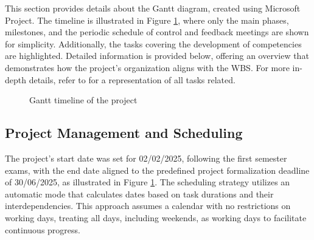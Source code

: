 This section provides details about the Gantt diagram, created using Microsoft Project. The timeline is illustrated in Figure \ref{fig:gantt_timeline}, where only the main phases, milestones, and the periodic schedule of control and feedback meetings are shown for simplicity. Additionally, the tasks covering the development of competencies are highlighted. Detailed information is provided below, offering an overview that demonstrates how the project’s organization aligns with the \gls{WBS}. For more in-depth details, refer to  for a representation of all tasks related.

\begin{figure}
      \centering
      \caption{Gantt timeline of the project}
      \label{fig:gantt_timeline}
\end{figure}


\subsection{Project Management and Scheduling}

The project’s start date was set for 02/02/2025, following the first semester exams, with the end date aligned to the predefined project formalization deadline of 30/06/2025, as illustrated in Figure \ref{fig:gantt_timeline}. The scheduling strategy utilizes an automatic mode that calculates dates based on task durations and their interdependencies. This approach assumes a calendar with no restrictions on working days, treating all days, including weekends, as working days to facilitate continuous progress.

